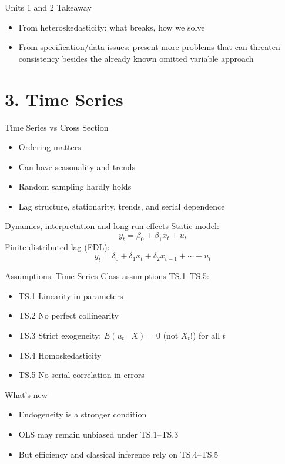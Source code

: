 \documentclass[aspectratio=169]{beamer}
\begin{document}
\begin{frame}{Units 1 and 2 Takeaway}
\begin{itemize}
    \item From heteroskedasticity: what breaks, how we solve
    \item From specification/data issues: present more problems that can threaten consistency besides the already known omitted variable approach
\end{itemize}
\end{frame}

\section{3. Time Series}

\begin{frame}{Time Series vs Cross Section}
\begin{itemize}
	\item Ordering matters
	\item Can have seasonality and trends
	\item Random sampling hardly holds
	\item Lag structure, stationarity, trends, and serial dependence
\end{itemize}
\end{frame}

\begin{frame}{Dynamics, interpretation and long-run effects}
Static model:
\[
y_t = \beta_0 + \beta_1 x_t + u_t
\]
Finite distributed lag (FDL):
\[
y_t = \delta_0 + \delta_1 x_t + \delta_2 x_{t-1} + \cdots + u_t
\]
\end{frame}

\begin{frame}{Assumptions: Time Series}
Class assumptions TS.1--TS.5:
\begin{itemize}
	\item TS.1 Linearity in parameters
	\item TS.2 No perfect collinearity
	\item TS.3 Strict exogeneity: $E(u_t\mid X)=0$ (not $X_t$!) for all $t$
	\item TS.4 Homoskedasticity
	\item TS.5 No serial correlation in errors
\end{itemize}
\end{frame}

\begin{frame}{What's new}
\begin{itemize}
    \item Endogeneity is a stronger condition
	\item OLS may remain unbiased under TS.1--TS.3
	\item But efficiency and classical inference rely on TS.4--TS.5
\end{itemize}
\end{frame}
\end{document}
